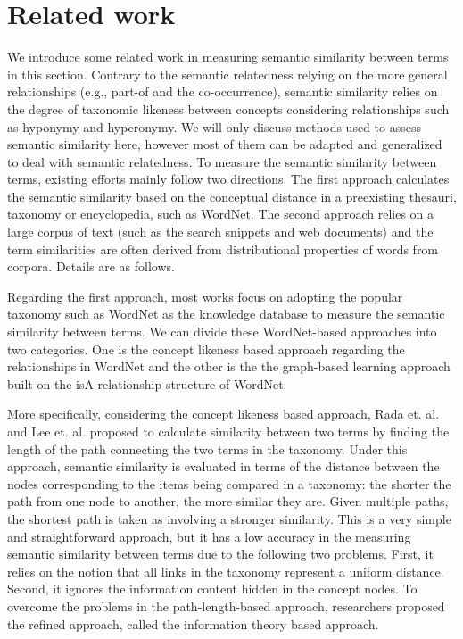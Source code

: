 \section{Related work}
We introduce some related work in measuring semantic similarity between terms in this section.
Contrary to the semantic relatedness relying on the more general relationships (e.g., part-of and the co-occurrence), semantic similarity relies on the degree of taxonomic
likeness between concepts considering relationships such as hyponymy and hyperonymy. We will only discuss methods used to assess semantic similarity here, however most of them can be adapted and generalized to deal with semantic relatedness. To measure the semantic similarity between terms, existing efforts mainly follow two directions. The first approach calculates the semantic similarity based on the conceptual distance in a preexisting thesauri, taxonomy or encyclopedia, such as WordNet. The second approach relies on a large corpus of text (such as the search snippets and web documents) and the term similarities are often derived from distributional properties of words from corpora. Details are as follows.

Regarding the first approach, most works focus on adopting the popular taxonomy such as WordNet as the knowledge database to measure the semantic similarity between terms. We can divide these WordNet-based approaches into two categories. One is the concept likeness based approach regarding the relationships in WordNet and the other is the the graph-based learning approach built on the isA-relationship structure of WordNet.

More specifically, considering the concept likeness based approach, Rada et. al. \cite{Rada:1989} and Lee et. al. \cite{Lee:1993} proposed to calculate similarity between two terms by finding the length of the path connecting the two terms in the taxonomy. Under this approach, semantic similarity is evaluated in terms of the distance between the nodes corresponding to the items being compared in a taxonomy: the shorter the path from one node to another, the more similar they are. Given multiple paths, the shortest path is taken as involving a stronger similarity. This is a very simple and straightforward approach, but it has a low accuracy in the measuring semantic similarity between terms due to the following two problems. First, it relies on the notion that all links in the taxonomy represent a uniform distance. Second, it ignores the information content hidden in the concept nodes. To overcome the problems in the path-length-based approach, researchers proposed the  refined approach, called the information theory based approach.

